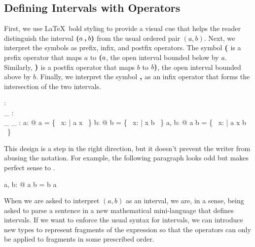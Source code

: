\documentclass{amsart}
\begin{document}
\subsection{Defining Intervals with Operators}

First, we use \LaTeX\ bold styling to provide a visual cue that helps the reader
distinguish the interval $\boldsymbol{(} a \mathbin{\boldsymbol{,}} b \boldsymbol{)}$ from the
usual ordered pair $(a, b)$.
Next, we interpret the symbols as prefix, infix, and postfix operators.
The symbol $\boldsymbol{(}$ is a prefix operator that maps $a$ to $\boldsymbol{(} a$, 
the open interval bounded below by $a$.
Similarly, $\boldsymbol{)}$ is a postfix operator that maps $b$ to $b \boldsymbol{)}$, 
the open interval bounded above by $b$.
Finally, we interpret the symbol $\mathbin{\boldsymbol{,}}$ as an infix operator that forms the intersection of the two intervals.

\begin{axdef}
	\lowerBound: \R \fun \power \R \\
	\_ \upperBound: \R \fun \power \R \\
	\_ \intersect \_ : \power \R \cross \power \R \fun \power \R
\where
	\forall a: \R @ \lowerBound a = \{~ x: \R | a \ltR x ~\}
\also
	\forall b: \R @ b \upperBound = \{~ x: \R | x \ltR b ~\}
\also
	\forall a, b: \R @ \lowerBound a \intersect b \upperBound = \{~ x: \R | a \ltR x \ltR b ~\}
\end{axdef}

This design is a step in the right direction, but it doesn't prevent the writer from abusing the notation.
For example, the following paragraph looks odd but makes perfect sense to \fuzz.

\begin{zed}
	\forall a, b: \R @ \lowerBound a \intersect b \upperBound = b \upperBound \intersect \lowerBound a 
\end{zed}

When we are asked to interpret $(a,b)$ as an interval, we are, in a sense, being asked to parse a sentence
in a new mathematical mini-language that defines intervals.
If we want to enforce the usual syntax for intervals,
we can introduce new types to represent fragments of the expression so that the operators can only be applied to
fragments in some prescribed order.
\end{document}

